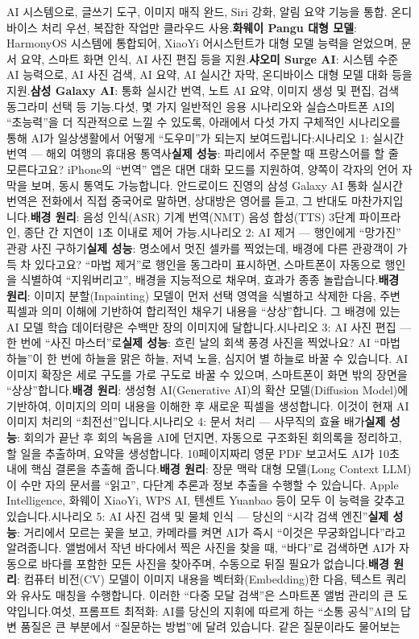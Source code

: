 AI 시스템으로, 글쓰기 도구, 이미지 매직 완드, Siri 강화, 알림 요약 기능을 통합. 온디바이스 처리 우선, 복잡한 작업만 클라우드 사용.\textbf{화웨이 Pangu 대형 모델}: HarmonyOS 시스템에 통합되어, XiaoYi 어시스턴트가 대형 모델 능력을 얻었으며, 문서 요약, 스마트 화면 인식, AI 사진 편집 등을 지원.\textbf{샤오미 Surge AI}: 시스템 수준 AI 능력으로, AI 사진 검색, AI 요약, AI 실시간 자막, 온디바이스 대형 모델 대화 등을 지원.\textbf{삼성 Galaxy AI}: 통화 실시간 번역, 노트 AI 요약, 이미지 생성 및 편집, 검색 동그라미 선택 등 기능.다섯, 몇 가지 일반적인 응용 시나리오와 실습스마트폰 AI의 “초능력”을 더 직관적으로 느낄 수 있도록, 아래에서 다섯 가지 구체적인 시나리오를 통해 AI가 일상생활에서 어떻게 “도우미”가 되는지 보여드립니다:시나리오 1: 실시간 번역 — 해외 여행의 휴대용 통역사\textbf{실제 성능}: 파리에서 주문할 때 프랑스어를 할 줄 모른다고요? iPhone의 “번역” 앱은 대면 대화 모드를 지원하여, 양쪽이 각자의 언어 자막을 보며, 동시 통역도 가능합니다. 안드로이드 진영의 삼성 Galaxy AI 통화 실시간 번역은 전화에서 직접 중국어로 말하면, 상대방은 영어를 듣고, 그 반대도 마찬가지입니다.\textbf{배경 원리}: 음성 인식(ASR) 기계 번역(NMT) 음성 합성(TTS) 3단계 파이프라인, 종단 간 지연이 1초 이내로 제어 가능.시나리오 2: AI 제거 — 행인에게 “망가진” 관광 사진 구하기\textbf{실제 성능}: 명소에서 멋진 셀카를 찍었는데, 배경에 다른 관광객이 가득 차 있다고요? “마법 제거”로 행인을 동그라미 표시하면, 스마트폰이 자동으로 행인을 식별하여 “지워버리고”, 배경을 지능적으로 채우며, 효과가 종종 놀랍습니다.\textbf{배경 원리}: 이미지 분할(Inpainting) 모델이 먼저 선택 영역을 식별하고 삭제한 다음, 주변 픽셀과 의미 이해에 기반하여 합리적인 채우기 내용을 “상상”합니다. 그 배경에 있는 AI 모델 학습 데이터량은 수백만 장의 이미지에 달합니다.시나리오 3: AI 사진 편집 — 한 번에 “사진 마스터”로\textbf{실제 성능}: 흐린 날의 회색 풍경 사진을 찍었나요? AI “마법 하늘”이 한 번에 하늘을 맑은 하늘, 저녁 노을, 심지어 별 하늘로 바꿀 수 있습니다. AI 이미지 확장은 세로 구도를 가로 구도로 바꿀 수 있으며, 스마트폰이 화면 밖의 장면을 “상상”합니다.\textbf{배경 원리}: 생성형 AI(Generative AI)의 확산 모델(Diffusion Model)에 기반하여, 이미지의 의미 내용을 이해한 후 새로운 픽셀을 생성합니다. 이것이 현재 AI 이미지 처리의 “최전선”입니다.시나리오 4: 문서 처리 — 사무직의 효율 배가\textbf{실제 성능}: 회의가 끝난 후 회의 녹음을 AI에 던지면, 자동으로 구조화된 회의록을 정리하고, 할 일을 추출하며, 요약을 생성합니다. 10페이지짜리 영문 PDF 보고서도 AI가 10초 내에 핵심 결론을 추출해 줍니다.\textbf{배경 원리}: 장문 맥락 대형 모델(Long Context LLM)이 수만 자의 문서를 “읽고”, 다단계 추론과 정보 추출을 수행할 수 있습니다. Apple Intelligence, 화웨이 XiaoYi, WPS AI, 텐센트 Yuanbao 등이 모두 이 능력을 갖추고 있습니다.시나리오 5: AI 사진 검색 및 물체 인식 — 당신의 “시각 검색 엔진”\textbf{실제 성능}: 거리에서 모르는 꽃을 보고, 카메라를 켜면 AI가 즉시 “이것은 무궁화입니다”라고 알려줍니다. 앨범에서 작년 바다에서 찍은 사진을 찾을 때, “바다”로 검색하면 AI가 자동으로 바다를 포함한 모든 사진을 찾아주며, 수동으로 뒤질 필요가 없습니다.\textbf{배경 원리}: 컴퓨터 비전(CV) 모델이 이미지 내용을 벡터화(Embedding)한 다음, 텍스트 쿼리와 유사도 매칭을 수행합니다. 이러한 “다중 모달 검색”은 스마트폰 앨범 관리의 큰 도약입니다.여섯, 프롬프트 최적화: AI를 당신의 지휘에 따르게 하는 “소통 공식”AI의 답변 품질은 큰 부분에서 “질문하는 방법”에 달려 있습니다. 같은 질문이라도 물어보는 